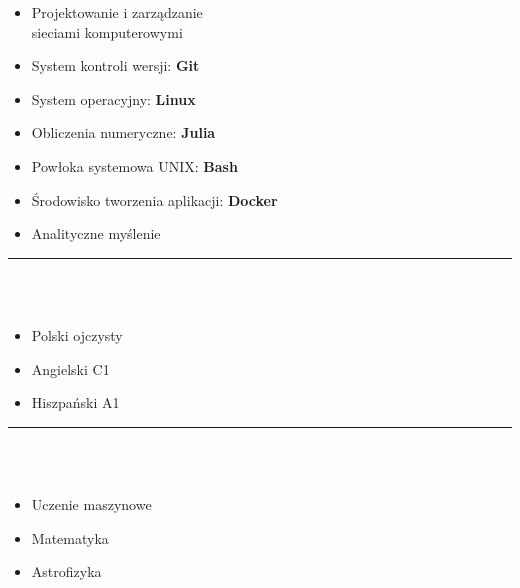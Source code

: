 \documentclass[10pt]{article}
\begin{document}
\begin{minipage}[t]{0.30\textwidth}
\begin{itemize}[leftmargin=*]
            \item Projektowanie i zarządzanie \\ sieciami komputerowymi
            \item System kontroli wersji: \textbf{Git}
            \item System operacyjny: \textbf{Linux}
            \item Obliczenia numeryczne: \textbf{Julia}
            \item Powłoka systemowa UNIX: \textbf{Bash} 
            \item Środowisko tworzenia aplikacji: \textbf{Docker}
            \item Analityczne myślenie
        \end{itemize}
        \rule{6cm}{1pt} \\ \\
        \fontsize{10pt}{10pt}
        \begin{itemize}[leftmargin=*]
            \setlength{\parskip}{0pt}
            \item Polski ojczysty
            \item Angielski C1
            \item Hiszpański A1
        \end{itemize}
        \rule{6cm}{1pt} \\ \\
        \fontsize{10pt}{10pt}
        \begin{itemize}[leftmargin=*]
            \setlength{\parskip}{0pt}
            \item Uczenie maszynowe
            \item Matematyka
            \item Astrofizyka
        \end{itemize}
    \end{minipage}
    \hfill %
\end{document}
